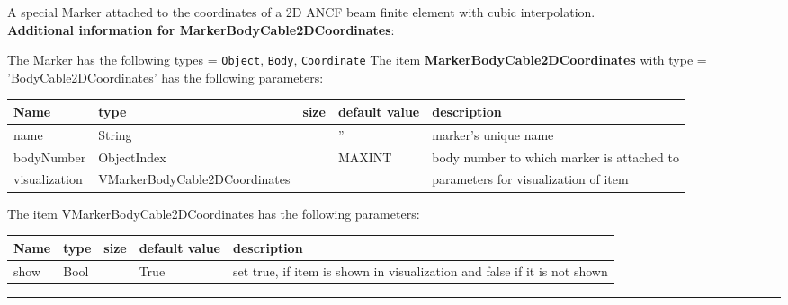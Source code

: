 \label{sec:item:MarkerBodyCable2DCoordinates}
A special Marker attached to the coordinates of a 2D ANCF beam finite element with cubic interpolation.\vspace{12pt}
 \\{\bf Additional information for MarkerBodyCable2DCoordinates}:
\bi
  \item The Marker has the following types = \texttt{Object}, \texttt{Body}, \texttt{Coordinate}
\ei
\vspace{12pt} \noindent The item {\bf MarkerBodyCable2DCoordinates} with type = 'BodyCable2DCoordinates' has the following parameters:\vspace{-1cm}\\ 
\begin{center}
  \footnotesize
  \begin{longtable}{| p{4.5cm} | p{2.5cm} | p{0.5cm} | p{2.5cm} | p{6cm} |}
    \hline
    \bf Name & \bf type & \bf size & \bf default value & \bf description \\ \hline
    name &     String &      &     '' &     marker's unique name\\ \hline
    bodyNumber &     ObjectIndex &      &     MAXINT &     body number to which marker is attached to\\ \hline
    visualization & VMarkerBodyCable2DCoordinates & & & parameters for visualization of item \\ \hline
	  \end{longtable}
	\end{center}
The item VMarkerBodyCable2DCoordinates has the following parameters:\vspace{-1cm}\\ 
\begin{center}
  \footnotesize
  \begin{longtable}{| p{4.5cm} | p{2.5cm} | p{0.5cm} | p{2.5cm} | p{6cm} |}
    \hline
    \bf Name & \bf type & \bf size & \bf default value & \bf description \\ \hline
    show &     Bool &      &     True &     set true, if item is shown in visualization and false if it is not shown\\ \hline
	  \end{longtable}
	\end{center}
\par\noindent\rule{\textwidth}{0.4pt}
